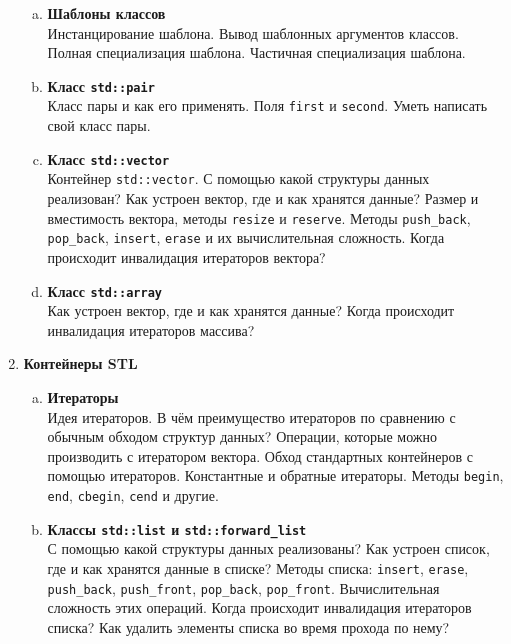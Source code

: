 \documentclass{article}
\begin{document}
\begin{enumerate}
\begin{enumerate}[a.]
\item \textbf{Шаблоны классов}\\
Инстанцирование шаблона. Вывод шаблонных аргументов классов. Полная специализация шаблона. Частичная специализация шаблона.

\item \textbf{Класс \texttt{std::pair}}\\
Класс пары и как его применять. Поля \texttt{first} и \texttt{second}. Уметь написать свой класс пары.

\item \textbf{Класс \texttt{std::vector}}\\
Контейнер \texttt{std::vector}. С помощью какой структуры данных реализован? Как устроен вектор, где и как хранятся данные? Размер и вместимость вектора, методы \texttt{resize} и \texttt{reserve}. Методы \texttt{push\_back}, \texttt{pop\_back}, \texttt{insert}, \texttt{erase} и их вычислительная сложность. Когда происходит инвалидация итераторов вектора?


\item \textbf{Класс \texttt{std::array}}\\
Как устроен вектор, где и как хранятся данные? 
Когда происходит инвалидация итераторов массива?
\end{enumerate}




\item \textbf{Контейнеры STL}
\begin{enumerate}[a.]

\item \textbf{Итераторы}\\
Идея итераторов. В чём преимущество итераторов по сравнению с обычным обходом структур данных? Операции, которые можно производить с итератором вектора. Обход стандартных контейнеров с помощью итераторов. Константные и обратные итераторы. Методы \texttt{begin}, \texttt{end}, \texttt{cbegin}, \texttt{cend} и другие.

\item \textbf{Классы \texttt{std::list} и \texttt{std::forward\_list}}\\
С помощью какой структуры данных реализованы? Как устроен список, где и как хранятся данные в списке? Методы списка: \texttt{insert}, \texttt{erase}, \texttt{push\_back}, \texttt{push\_front}, \texttt{pop\_back}, \texttt{pop\_front}. Вычислительная сложность этих операций. Когда происходит инвалидация итераторов списка? Как удалить элементы списка во время прохода по нему? 



\end{enumerate}
\end{enumerate}
\end{document}
